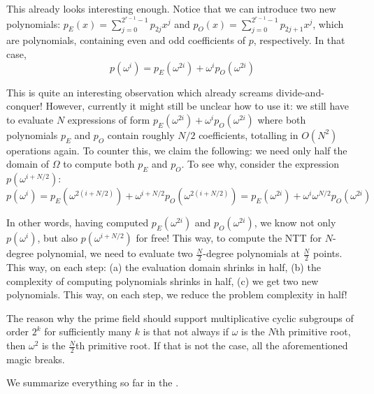 \documentclass[../lecture-notes-148x210.tex]{subfiles}
\begin{document}
This already looks interesting enough. Notice that we can introduce two new polynomials: $p_E(x)=\sum_{j=0}^{2^{r-1}-1}p_{2j}x^{j}$ and $p_O(x)=\sum_{j=0}^{2^{r-1}-1}p_{2j+1}x^{j}$, 
which are polynomials, containing even and odd coefficients of $p$, respectively. In that case, 
\begin{equation*}
    p(\omega^i) = p_E(\omega^{2i}) + \omega^i p_O(\omega^{2i})
\end{equation*}

This is quite an interesting observation which already screams
divide-and-conquer! However, currently it might still be unclear 
how to use it: we still have to evaluate $N$ expressions of 
form $p_E(\omega^{2i}) + \omega^i p_O(\omega^{2i})$ where both 
polynomials $p_E$ and $p_O$ contain roughly $N/2$ coefficients, totalling 
in $O(N^2)$ operations again. To counter this, we claim the following: 
we need only half the domain of $\Omega$ to compute both $p_E$ and $p_O$.
To see why, consider the expression $p(\omega^{i+N/2})$:
\begin{equation*}
    p(\omega^i) = p_E(\omega^{2(i+N/2)}) + \omega^{i+N/2}p_O(\omega^{2(i+N/2)}) = p_E(\omega^{2i}) + \omega^{i}\omega^{N/2}p_O(\omega^{2i})
\end{equation*}

In other words, having computed $p_E(\omega^{2i})$ and $p_O(\omega^{2i})$, we
know not only $p(\omega^i)$, but also $p(\omega^{i+N/2})$ for free! This way, to
compute the \textsf{NTT} for $N$-degree polynomial, we need to evaluate two
$\frac{N}{2}$-degree polynomials at $\frac{N}{2}$ points. This way, on each
step: (a) the evaluation domain shrinks in half, (b) the complexity of computing
polynomials shrinks in half, (c) we get two new polynomials. This way, on each
step, we reduce the problem complexity in half!

The reason why the prime field should support multiplicative cyclic subgroups 
of order $2^k$ for sufficiently many $k$ is that not always if $\omega$ is the 
$N$th primitive root, then $\omega^2$ is the $\frac{N}{2}$th primitive root. If that is 
not the case, all the aforementioned magic breaks.

We summarize everything so far in the .
\end{document}
